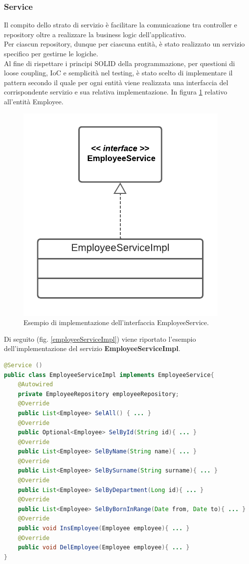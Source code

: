 \subsubsection*{Service}
Il compito dello strato di servizio è facilitare la comunicazione tra controller e repository oltre a realizzare la business logic dell'applicativo.\\
Per ciascun repository, dunque per ciascuna entità, è stato realizzato un servizio specifico per gestirne le logiche.\\
Al fine di rispettare i principi SOLID della programmazione, per questioni di loose coupling, IoC e semplicità nel testing, è stato scelto di implementare il pattern secondo il quale per ogni entità viene realizzata una interfaccia del corrispondente servizio e sua relativa implementazione. In figura \ref{service-serviceImpl} relativo all'entità Employee.
\FloatBarrier
\begin{figure}[!ht]
\centering
\includegraphics[width=0.3\linewidth]{immagini/service_serviceImpl.pdf}
\caption{Esempio di implementazione dell'interfaccia EmployeeService.}
\label{service-serviceImpl}
\end{figure}
\FloatBarrier
Di seguito (fig. \ref{employeeServiceImpl}) viene riportato l'esempio dell'implementazione del servizio \textbf{EmployeeServiceImpl}.
\begin{lstlisting}[language=Java, morecomment={[s][\color{DarkOrchid}]{@}{\ }},  morecomment={[s][\color{OliveGreen}]{"}{"}},]
@Service ()
public class EmployeeServiceImpl implements EmployeeService{
    @Autowired
    private EmployeeRepository employeeRepository;
    @Override
    public List<Employee> SelAll() { ... }
    @Override
    public Optional<Employee> SelById(String id){ ... }
    @Override
    public List<Employee> SelByName(String name){ ... }
    @Override
    public List<Employee> SelBySurname(String surname){ ... }
    @Override
    public List<Employee> SelByDepartment(Long id){ ... }
    @Override
    public List<Employee> SelByBornInRange(Date from, Date to){ ... }
    @Override
    public void InsEmployee(Employee employee){ ... }
    @Override
    public void DelEmployee(Employee employee){ ... }
}
\end{lstlisting}
